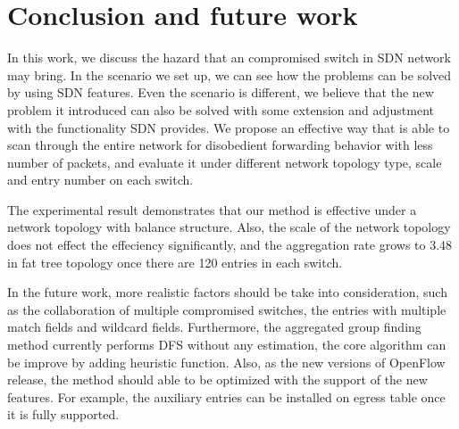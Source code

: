 \chapter{Conclusion and future work}
\label{conclusion}
In this work, we discuss the hazard that an compromised switch in SDN network may bring. In the scenario we set up, we can see how the problems can be solved by using SDN features. Even the scenario is different, we believe that the new problem it introduced can also be solved with some extension and adjustment with the functionality SDN provides. We propose an effective way that is able to scan through the entire network for disobedient forwarding behavior with less number of packets, and evaluate it under different network topology type, scale and entry number on each switch.

The experimental result demonstrates that our method is effective under a network topology with balance structure. Also, the scale of the network topology does not effect the effeciency significantly, and the aggregation rate grows to 3.48 in fat tree topology once there are 120 entries in each switch. 

In the future work, more realistic factors should be take into consideration, such as the collaboration of multiple compromised switches, the entries with multiple match fields and wildcard fields. Furthermore, the aggregated group finding method currently performs DFS without any estimation, the core algorithm can be improve by adding heuristic function. Also, as the new versions of OpenFlow release, the method should able to be optimized with the support of the new features. For example, the auxiliary entries can be installed on egress table once it is fully supported.